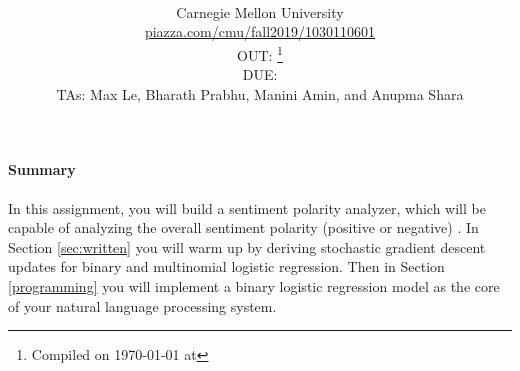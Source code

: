 \documentclass[11pt]{article}
\title{\textsc{\hwName}} %
\author{\courseName\\
  Carnegie Mellon University \\
\url{piazza.com/cmu/fall2019/1030110601} \\
OUT: \outDate{} \thanks{Compiled on \today{} at \currenttime{}} \\
DUE: \dueDate{} \\ 
TAs: Max Le, Bharath Prabhu, Manini Amin, and Anupma Shara}
\date{}
\date{}
\numberwithin{equation}{section} %
\numberwithin{figure}{section} %
\numberwithin{table}{section} %
\begin{document}
\maketitle

\begin{notebox}
\paragraph{Summary} In this assignment, you will build a sentiment polarity analyzer, which will be capable of analyzing the overall sentiment polarity (positive or negative) . In Section  \ref{sec:written} you will warm up by deriving stochastic gradient descent updates for binary and multinomial logistic regression. Then in Section \ref{programming} you will implement a binary logistic regression model as the core of your natural language processing system.
\end{notebox}
\end{document}
